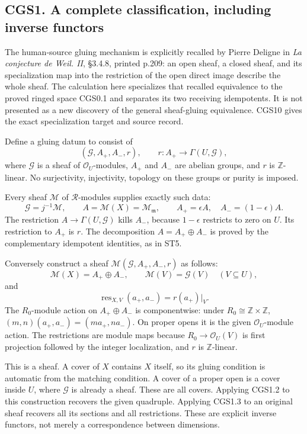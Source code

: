 \subsection{CGS1. A complete classification, including inverse
functors}\label{cgs1.-a-complete-classification-including-inverse-functors}

The human-source gluing mechanism is explicitly recalled by Pierre
Deligne in \emph{La conjecture de Weil. II}, §3.4.8, printed p.209: an
open sheaf, a closed sheaf, and its specialization map into the
restriction of the open direct image describe the whole sheaf. The
calculation here specializes that recalled equivalence to the proved
ringed space CGS0.1 and separates its two receiving idempotents. It is
not presented as a new discovery of the general sheaf-gluing
equivalence. CGS10 gives the exact specialization target and source
record.

Define a gluing datum to consist of \[
 (\mathcal G,A_+,A_-,r),\qquad
 r:A_+\longrightarrow\Gamma(U,\mathcal G),
\tag{CGS1.1}
\] where \(\mathcal G\) is a sheaf of \(\mathcal O_U\)-modules, \(A_+\)
and \(A_-\) are abelian groups, and \(r\) is \(\mathbb Z\)-linear. No
surjectivity, injectivity, topology on these groups or purity is
imposed.

Every sheaf \(\mathcal M\) of \(\mathcal R\)-modules supplies exactly
such data: \[
 \mathcal G=j^{-1}\mathcal M,\qquad
 A=\mathcal M(X)=\mathcal M_{\mathfrak m},\qquad
 A_+=\epsilon A,\quad A_-=(1-\epsilon)A.
\tag{CGS1.2}
\] The restriction \(A\to\Gamma(U,\mathcal G)\) kills \(A_-\), because
\(1-\epsilon\) restricts to zero on \(U\). Its restriction to \(A_+\) is
\(r\). The decomposition \(A=A_+\oplus A_-\) is proved by the
complementary idempotent identities, as in ST5.

Conversely construct a sheaf \(\mathcal M(\mathcal G,A_+,A_-,r)\) as
follows: \[
 \mathcal M(X)=A_+\oplus A_-,\qquad
 \mathcal M(V)=\mathcal G(V)\quad(V\subseteq U),
\tag{CGS1.3}
\] and \[
 \operatorname{res}_{X,V}(a_+,a_-)=r(a_+)|_V.
\tag{CGS1.4}
\] The \(R_0\)-module action on \(A_+\oplus A_-\) is componentwise:
under \(R_0\cong\mathbb Z\times\mathbb Z\),
\((m,n)(a_+,a_-)=(ma_+,na_-)\). On proper opens it is the given
\(\mathcal O_U\)-module action. The restrictions are module maps because
\(R_0\to\mathcal O_U(V)\) is first projection followed by the integer
localization, and \(r\) is \(\mathbb Z\)-linear.

This is a sheaf. A cover of \(X\) contains \(X\) itself, so its gluing
condition is automatic from the matching condition. A cover of a proper
open is a cover inside \(U\), where \(\mathcal G\) is already a sheaf.
These are all covers. Applying CGS1.2 to this construction recovers the
given quadruple. Applying CGS1.3 to an original sheaf recovers all its
sections and all restrictions. These are explicit inverse functors, not
merely a correspondence between dimensions.

